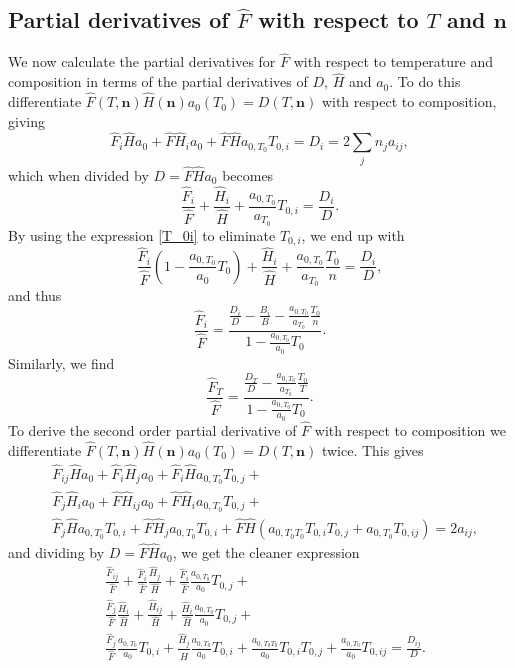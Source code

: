 \documentclass[english]{../thermomemo/thermomemo}
\newcommand{\mbn}[0]{\mathbf n}
\newcommand*{\hF}[0]{\hat F}
\newcommand*{\hH}[0]{\hat H}
\newcommand{\lp}{\left(}
\newcommand{\rp}{\right)}
\numberwithin{equation}{section}
\begin{document}
\subsection*{Partial derivatives of $\hF$ with respect to $T$ and
  $\mbn$}
We now calculate the partial derivatives for $\hF$ with respect to
temperature and composition in terms of the partial derivatives of
$D$, $\hH$ and $a_0$. To do this differentiate $\hF(T,\mbn) \hH(\mbn)
a_0(T_0) = D(T,\mbn)$ with respect to composition, giving
$$
\hF_i \hH a_0 + \hF \hH_i a_0 + \hF \hH a_{0,T_0} T_{0,i} = D_i = 2
\sum_j n_j a_{ij},
$$
which when divided by $D = \hF \hH a_0$ becomes
$$
\frac{\hF_i}{\hF} + \frac{\hH_i}{\hH} +
\frac{a_{0,T_0}}{a_{T_0}}T_{0,i}= \frac{D_i}{D}.
$$
By using the expression \eqref{T_0i} to eliminate $T_{0,i}$, we end up
with
$$
\frac{\hF_i}{\hF} \lp 1-\frac{a_{0,T_0}}{a_0} T_0 \rp +
\frac{\hH_i}{\hH} + \frac{a_{0,T_0}}{a_{T_0}}\frac{T_0}{n} =
\frac{D_i}{D},
$$
and thus
\begin{equation}
  \frac{\hF_i}{\hF} = \frac{\frac{D_i}{D} - \frac{B_i}{B} - \frac{a_{0,T_0}}{a_{T_0}}\frac{T_0}{n}}{1-\frac{a_{0,T_0}}{a_0} T_0}.
\end{equation}
Similarly, we find
\begin{equation}
  \frac{\hF_T}{\hF} = \frac{\frac{D_T}{D} - \frac{a_{0,T_0}}{a_{T_0}}\frac{T_0}{T}}{1-\frac{a_{0,T_0}}{a_0} T_0}.
\end{equation}
To derive the second order partial derivative of $\hF$ with respect to
composition we differentiate $\hF(T,\mbn) \hH(\mbn) a_0(T_0) =
D(T,\mbn)$ twice. This gives
\begin{align*}
  &\hF_{ij} \hH a_0 + \hF_i \hH_j a_0 + \hF_i\hH a_{0,T_0} T_{0,j} + \\
  &\hF_{j} \hH_i a_0 + \hF \hH_{ij} a_0 + \hF \hH_i a_{0,T_0} T_{0,j} + \\
  &\hF_j \hH a_{0,T_0} T_{0,i} + \hF \hH_j a_{0,T_0} T_{0,i} + \hF \hH
  (a_{0,T_0T_0} T_{0,i} T_{0,j} + a_{0,T_0} T_{0,ij}) = 2 a_{ij},
\end{align*}
and dividing by $D = \hF \hH a_0$, we get the cleaner expression
\begin{equation}
  \label{hF_ij}
  \begin{aligned}
    &\frac{\hF_{ij}}{\hF} + \frac{\hF_i}{\hF}\frac{\hH_j}{\hH} + \frac{\hF_i}{\hF}\frac{a_{0,T_0}}{a_0} T_{0,j} + \\
    &\frac{\hF_{j}}{\hF} \frac{\hH_i}{\hH} + \frac{\hH_{ij}}{\hH} + \frac{\hH_i}{\hH}\frac{a_{0,T_0}}{a_0} T_{0,j} + \\
    &\frac{\hF_j}{\hF}\frac{a_{0,T_0}}{a_0} T_{0,i} +
    \frac{\hH_j}{\hH}\frac{a_{0,T_0}}{a_0} T_{0,i} +
    \frac{a_{0,T_0T_0}}{a_0} T_{0,i} T_{0,j} + \frac{a_{0,T_0}}{a_0}
    T_{0,ij} = \frac{D_{ij}}{D}.
  \end{aligned}
\end{equation}
\end{document}
